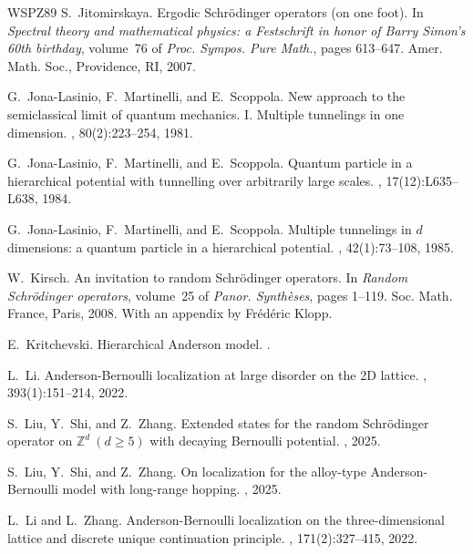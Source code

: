\documentclass[11pt,reqno,UTF8,twoside]{amsart}
\theoremstyle{definition}
\numberwithin{equation}{section}
\begin{document}
\begin{thebibliography}{WSPZ89}
S.~Jitomirskaya.
\newblock Ergodic {S}chr\"{o}dinger operators (on one foot).
\newblock In {\em Spectral theory and mathematical physics: a {F}estschrift in
  honor of {B}arry {S}imon's 60th birthday}, volume~76 of {\em Proc. Sympos.
  Pure Math.}, pages 613--647. Amer. Math. Soc., Providence, RI, 2007.

G.~Jona-Lasinio, F.~Martinelli, and E.~Scoppola.
\newblock New approach to the semiclassical limit of quantum mechanics. {I}.
  {M}ultiple tunnelings in one dimension.
, 80(2):223--254, 1981.

G.~Jona-Lasinio, F.~Martinelli, and E.~Scoppola.
\newblock Quantum particle in a hierarchical potential with tunnelling over
  arbitrarily large scales.
, 17(12):L635--L638, 1984.

G.~Jona-Lasinio, F.~Martinelli, and E.~Scoppola.
\newblock Multiple tunnelings in {$d$} dimensions: a quantum particle in a
  hierarchical potential.
, 42(1):73--108,
  1985.

W.~Kirsch.
\newblock An invitation to random {S}chr\"{o}dinger operators.
\newblock In {\em Random {S}chr\"{o}dinger operators}, volume~25 of {\em Panor.
  Synth\`eses}, pages 1--119. Soc. Math. France, Paris, 2008.
\newblock With an appendix by Fr\'{e}d\'{e}ric Klopp.

E.~Kritchevski.
\newblock Hierarchical {A}nderson model.
.

L.~Li.
\newblock Anderson-{B}ernoulli localization at large disorder on the 2{D}
  lattice.
, 393(1):151--214, 2022.

S.~Liu, Y.~Shi, and Z.~Zhang.
\newblock Extended states for the random {S}chr{\"o}dinger operator on
  $\mathbb{Z}^d\ (d\geq5)$ with decaying {B}ernoulli potential.
, 2025.

S.~Liu, Y.~Shi, and Z.~Zhang.
\newblock On localization for the alloy-type {A}nderson-{B}ernoulli model with
  long-range hopping.
, 2025.

L.~Li and L.~Zhang.
\newblock Anderson-{B}ernoulli localization on the three-dimensional lattice
  and discrete unique continuation principle.
, 171(2):327--415, 2022.


\end{thebibliography}
\end{document}
